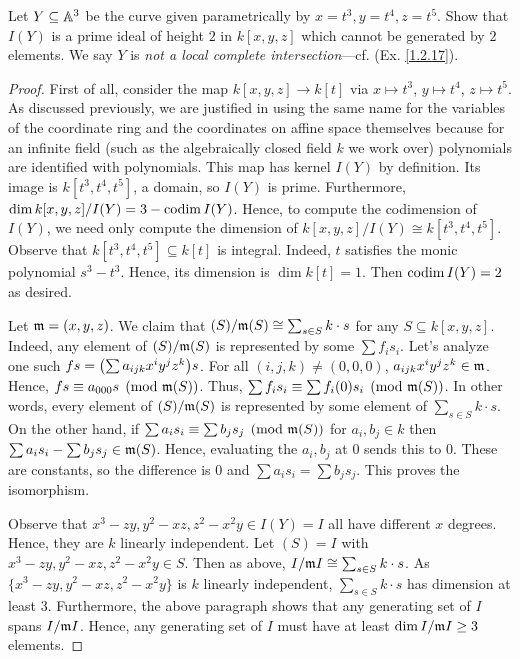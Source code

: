 \label{1.1.11}

Let $Y \subseteq \mathbb A^3$ be the curve given parametrically by $x = t^3, y = t^4, z = t^5$. Show that $I(Y)$ is a prime ideal of height $2$ in $k[x,y,z]$ which cannot be generated by $2$ elements. We say $Y$ is \textit{not a local complete intersection}---cf. (Ex. \ref{1.2.17}).

\begin{proof}
    First of all, consider the map $k[x, y, z] \longrightarrow k[t]$ via $x \mapsto t^3$, $y\mapsto t^4$, $z \mapsto t^5$. As discussed previously, we are justified in using the same name for the variables of the coordinate ring and the coordinates on affine space themselves because for an infinite field (such as the algebraically closed field $k$ we work over) polynomials are identified with polynomials. This map has kernel $I(Y)$ by definition. Its image is $k[t^3, t^4, t^5]$, a domain, so $I(Y)$ is prime. Furthermore, $\dim k[x, y, z]/I(Y) = 3 - \operatorname{codim} I(Y)$. Hence, to compute the codimension of $I(Y)$, we need only compute the dimension of $k[x, y, z]/I(Y) \cong k[t^3, t^4, t^5]$. Observe that $k[t^3, t^4, t^5] \subseteq k[t]$ is integral. Indeed, $t$ satisfies the monic polynomial $s^3 - t^3$. Hence, its dimension is $\dim k[t] = 1$. Then $\operatorname{codim} I(Y) = 2$ as desired.
    
    Let $\mathfrak m = (x, y, z)$. We claim that $(S) / \mathfrak m (S) \cong \sum_{s \in S} k \cdot s$ for any $S \subseteq k[x, y, z]$. Indeed, any element of $(S)/ \mathfrak m (S)$ is represented by some $\sum f_i s_i$. Let's analyze one such $f s = {\left(\sum a_{ijk} x^i y^j z^k\right)} s$. For all $(i, j, k) \neq (0, 0, 0)$, $a_{ijk} x^i y^j z^k \in \mathfrak m$. Hence, $f s \equiv a_{000} s \pmod{\mathfrak m (S)}$. Thus, $\sum f_i s_i \equiv \sum f_i(0) s_i \pmod{\mathfrak m (S)}$. In other words, every element of $(S) / \mathfrak m (S)$ is represented by some element of $\sum_{s \in S} k \cdot s$. On the other hand, if $\sum a_i s_i \equiv \sum b_j s_j \pmod{\mathfrak m (S)}$ for $a_i, b_j \in k$ then $\sum a_i s_i - \sum b_j s_j \in \mathfrak m (S)$. Hence, evaluating the $a_i, b_j$ at $0$ sends this to $0$. These are constants, so the difference is $0$ and $\sum a_i s_i = \sum b_j s_j$. This proves the isomorphism.
    
    Observe that $x^3 - zy, y^2 - xz, z^2 - x^2 y \in I(Y) = I$ all have different $x$ degrees. Hence, they are $k$ linearly independent. Let $(S) = I$ with $x^3 - zy, y^2 - xz, z^2 - x^2 y \in S$. Then as above, $I / \mathfrak m I \cong \sum_{s \in S} k \cdot s$. As $\{x^3 - zy, y^2 - xz, z^2 - x^2 y\}$ is $k$ linearly independent, $\sum_{s \in S} k \cdot s$ has dimension at least $3$. Furthermore, the above paragraph shows that any generating set of $I$ spans $I / \mathfrak m I$. Hence, any generating set of $I$ must have at least $\dim I /\mathfrak m I \geq 3$ elements.
\end{proof}